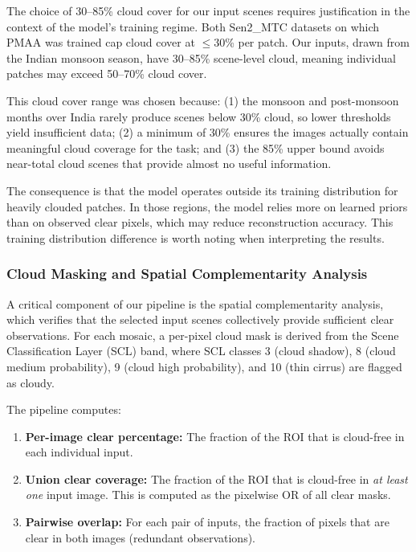 \documentclass[12pt,a4paper]{article}
\begin{document}
The choice of 30--85\% cloud cover for our input scenes requires justification in the context of the model's training regime. Both Sen2\_MTC datasets on which PMAA was trained cap cloud cover at $\leq$30\% per patch. Our inputs, drawn from the Indian monsoon season, have 30--85\% scene-level cloud, meaning individual patches may exceed 50--70\% cloud cover.

This cloud cover range was chosen because: (1) the monsoon and post-monsoon months over India rarely produce scenes below 30\% cloud, so lower thresholds yield insufficient data; (2) a minimum of 30\% ensures the images actually contain meaningful cloud coverage for the task; and (3) the 85\% upper bound avoids near-total cloud scenes that provide almost no useful information.

The consequence is that the model operates outside its training distribution for heavily clouded patches. In those regions, the model relies more on learned priors than on observed clear pixels, which may reduce reconstruction accuracy. This training distribution difference is worth noting when interpreting the results.

\subsubsection{Cloud Masking and Spatial Complementarity Analysis}

A critical component of our pipeline is the spatial complementarity analysis, which verifies that the selected input scenes collectively provide sufficient clear observations. For each mosaic, a per-pixel cloud mask is derived from the Scene Classification Layer (SCL) band, where SCL classes 3 (cloud shadow), 8 (cloud medium probability), 9 (cloud high probability), and 10 (thin cirrus) are flagged as cloudy.

The pipeline computes:
\begin{enumerate}[leftmargin=2em]
    \item \textbf{Per-image clear percentage:} The fraction of the ROI that is cloud-free in each individual input.
    \item \textbf{Union clear coverage:} The fraction of the ROI that is cloud-free in \textit{at least one} input image. This is computed as the pixelwise OR of all clear masks.
    \item \textbf{Pairwise overlap:} For each pair of inputs, the fraction of pixels that are clear in both images (redundant observations).
\end{enumerate}
\end{document}
